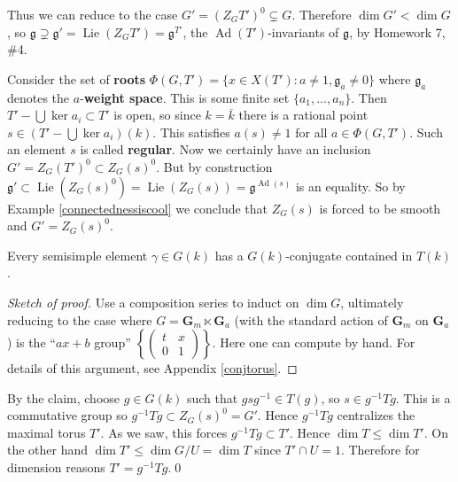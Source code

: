 \documentclass[10pt]{article}
\renewcommand{\(}{\left(}
\renewcommand{\)}{\right)}
\numberwithin{thm}{subsection}
\begin{document}
Thus we can reduce to the case $G'=(Z_GT')^0\subsetneq G$.
Therefore $\dim G'<\dim G$,
so $\mathfrak{g}\supsetneq \mathfrak{g}'=\operatorname{Lie}(Z_G T')
= \mathfrak{g}^{T'}$, the $\operatorname{Ad}(T')$-invariants of $\mathfrak{g}$,
by Homework 7, \#4. 

Consider the set of \textbf{roots}
$\Phi(G,T')=\{x\in X(T'):a\neq 1, \mathfrak{g}_a\neq 0\}$
where $\mathfrak{g}_a$ denotes the $a$-\textbf{weight space}.
This is some finite set $\{a_1,\ldots, a_n\}$.
Then $T'-\bigcup \operatorname{ker}a_i\subset T'$
is open,
so since $k=\overline{k}$
there is a rational point $s\in (T'-\bigcup \operatorname{ker}a_i)(k)$.
This satisfies $a(s)\neq 1$ for all $a\in \Phi(G,T')$.
Such an element $s$ is called \textbf{regular}.
Now we certainly have an inclusion $G'=Z_G(T')^0\subset Z_G(s)^0$.
But by construction
$\mathfrak{g}'\subset \operatorname{Lie}(Z_G(s)^0)=\operatorname{Lie}(Z_G(s))
= \mathfrak{g}^{\operatorname{Ad}(s)}$
is an equality.
So by Example \ref{connectednessiscool}
we conclude that $Z_G(s)$ is forced to be smooth
and $G'=Z_G(s)^0$.

\begin{claim}
Every semisimple element $\gamma\in G(k)$ has a $G(k)$-conjugate contained in $T(k)$.
\end{claim}
\begin{proof}[Sketch of proof]
Use a composition series to induct on $\dim G$, ultimately
reducing to the case where $G=\mathbf{G}_m\ltimes \mathbf{G}_a$ (with the
standard action of $\mathbf{G}_m$ on $\mathbf{G}_a$)
is the ``$ax+b$ group'' $\left\{\left(\begin{smallmatrix}
 t&x\\0&1
\end{smallmatrix}\right)\right\}$.
Here one can compute by hand.
For details of this argument, see Appendix \ref{conjtorus}. 
\end{proof}

By the claim, choose $g\in G(k)$
such that $gsg^{-1}\in T(g)$, so
$s\in g^{-1}Tg$.
This is a commutative group
so $g^{-1}T g\subset Z_G(s)^0=G'$.
Hence $g^{-1}Tg$ centralizes the maximal torus $T'$.
As we saw, this forces $g^{-1}Tg\subset T'$.
Hence $\dim T\leq \dim T'$.
On the other hand $\dim T'\leq \dim G/U=\dim T$
since $T'\cap U=1$.
Therefore for dimension reasons $T'=g^{-1}Tg$.\qed 
\end{document}
